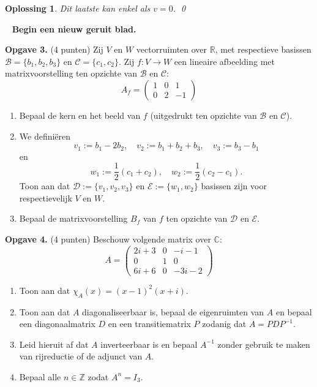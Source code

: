 \documentclass[a4paper,12pt]{article}
\newtheorem{oplossing}{Oplossing}
\begin{document}
\begin{enumerate}
\begin{oplossing}
        Dit laatste kan enkel als \(v=0\). \qed
    \end{oplossing}
\
\vspace{0.5cm}
\textbf{Begin een nieuw geruit blad.}
\vspace{0.5cm}

\textbf{Opgave 3.} (4 punten) Zij $V$ en $W$ vectorruimten over $\mathbb{R}$, met respectieve basissen $\mathcal{B}=\{b_{1},b_{2},b_{3}\}$ en $\mathcal{C}=\{c_{1},c_{2}\}$. Zij $f:V \to W$ een lineaire afbeelding met matrixvoorstelling ten opzichte van $\mathcal{B}$ en $\mathcal{C}$:
\[
A_{f} = \begin{pmatrix}
1 & 0 & 1 \\
0 & 2 & -1
\end{pmatrix}
\]
\begin{enumerate}
    \item[(i)] Bepaal de kern en het beeld van $f$ (uitgedrukt ten opzichte van $\mathcal{B}$ en $\mathcal{C}$).
    \item[(ii)] We definiëren
    \[
    v_{1} := b_{1} - 2b_{2}, \quad v_{2} := b_{1} + b_{2} + b_{3}, \quad v_{3} := b_{3} - b_{1}
    \]
    en
    \[
    w_{1} := \frac{1}{2}(c_{1} + c_{2}), \quad w_{2} := \frac{1}{2}(c_{2} - c_{1}).
    \]
    Toon aan dat $\mathcal{D}:=\{v_{1},v_{2},v_{3}\}$ en $\mathcal{E}:=\{w_{1},w_{2}\}$ basissen zijn voor respectievelijk $V$ en $W$.
    \item[(iii)] Bepaal de matrixvoorstelling $B_{f}$ van $f$ ten opzichte van $\mathcal{D}$ en $\mathcal{E}$.
\end{enumerate}

\vspace{0.5cm}

\textbf{Opgave 4.} (4 punten) Beschouw volgende matrix over $\mathbb{C}$:
\[
A = \begin{pmatrix}
2i+3 & 0 & -i-1 \\
0 & 1 & 0 \\
6i+6 & 0 & -3i-2
\end{pmatrix}
\]
\begin{enumerate}
    \item[(i)] Toon aan dat $\chi_{A}(x) = (x-1)^{2}(x+i)$.
    \item[(ii)] Toon aan dat $A$ diagonaliseerbaar is, bepaal de eigenruimten van $A$ en bepaal een diagonaalmatrix $D$ en een transitiematrix $P$ zodanig dat $A = PDP^{-1}$.
    \item[(iii)] Leid hieruit af dat $A$ inverteerbaar is en bepaal $A^{-1}$ zonder gebruik te maken van rijreductie of de adjunct van $A$.
    \item[(iv)] Bepaal alle $n \in \mathbb{Z}$ zodat $A^{n} = I_{3}$.
\end{enumerate}




\end{enumerate}
\end{document}
